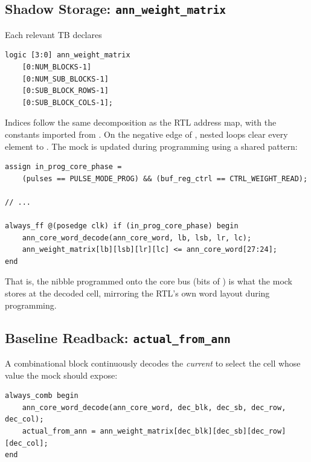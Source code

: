 \subsection{Shadow Storage: \texttt{ann\_weight\_matrix}}
\label{sec:verif-mock-matrix}

Each relevant TB declares

\begin{lstlisting}[style=svstyle]
logic [3:0] ann_weight_matrix
    [0:NUM_BLOCKS-1]
    [0:NUM_SUB_BLOCKS-1]
    [0:SUB_BLOCK_ROWS-1]
    [0:SUB_BLOCK_COLS-1];
\end{lstlisting}

Indices follow the same  decomposition
as the RTL address map, with the  constants imported from
. On the negative edge of , nested
 loops clear every element to . The mock is updated
during programming using a shared pattern:

\begin{lstlisting}[style=svstyle]
assign in_prog_core_phase =
    (pulses == PULSE_MODE_PROG) && (buf_reg_ctrl == CTRL_WEIGHT_READ);

// ...

always_ff @(posedge clk) if (in_prog_core_phase) begin
    ann_core_word_decode(ann_core_word, lb, lsb, lr, lc);
    ann_weight_matrix[lb][lsb][lr][lc] <= ann_core_word[27:24];
end
\end{lstlisting}

That is, the nibble programmed onto the core bus (bits
\sv{[27:24]} of ) is what the mock stores at
the decoded cell, mirroring the RTL's own word layout during
programming.

\subsection{Baseline Readback: \texttt{actual\_from\_ann}}
\label{sec:verif-mock-readback}

A combinational block continuously decodes the \emph{current}
 to select the cell whose value the mock
should expose:

\begin{lstlisting}[style=svstyle]
always_comb begin
    ann_core_word_decode(ann_core_word, dec_blk, dec_sb, dec_row, dec_col);
    actual_from_ann = ann_weight_matrix[dec_blk][dec_sb][dec_row][dec_col];
end
\end{lstlisting}

